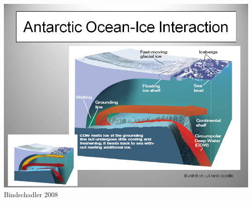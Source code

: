 \begin{frame}
  \includegraphics[width=\textwidth]{figures/GroundingLine/NaturalHistory2008} \\
  \vspace{-.5em}
  {\tiny Bindschadler 2008}
\end{frame}
